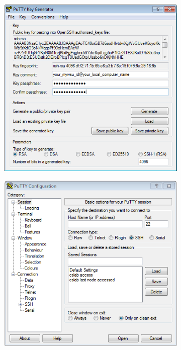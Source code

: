 \documentclass[12pt]{article}
\begin{document}
\begin{flushleft}
\begin{figure}[bh!]
\centering
\begin{subfigure}{.5\textwidth}
  \centering
  \includegraphics[width=.9\linewidth]{puttygen_key_gen_fields}
  \label{fig:sub1}
\end{subfigure}%
\begin{subfigure}{.5\textwidth}
  \centering
  \includegraphics[width=.9\linewidth]{putty_cslab_session_tab}

\end{subfigure}
\end{figure}
\end{flushleft}
\end{document}
